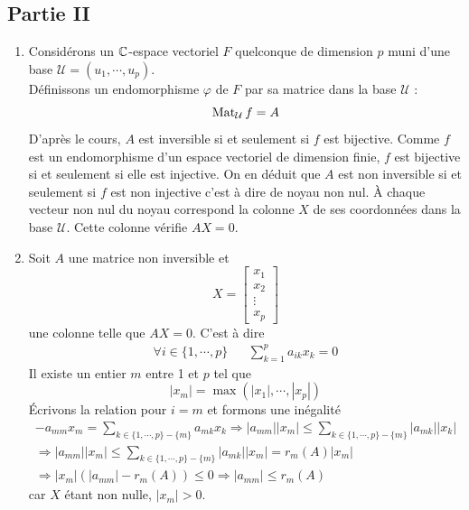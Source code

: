 \subsection*{Partie II}
\begin{enumerate}
\item Considérons un $\mathbb{C}$-espace vectoriel $F$ quelconque de dimension $p$ muni d'une base $\mathcal U =(u_1,\cdots,u_p)$.\\ Définissons un endomorphisme $\varphi$ de $F$ par sa matrice dans la base $\mathcal U$ :
\begin{displaymath}
 \operatorname{Mat}_{\mathcal U} f = A
\end{displaymath}
D'après le cours, $A$ est inversible si et seulement si $f$ est bijective. Comme $f$ est un endomorphisme d'un espace vectoriel de dimension finie, $f$ est bijective si et seulement si elle est injective. On en déduit que $A$ est non inversible si et seulement si $f$ est non injective c'est à dire de noyau non nul. \`A chaque vecteur non nul du noyau correspond la colonne $X$ de ses coordonnées dans la base $\mathcal U$. Cette colonne vérifie $AX=0$.
\item Soit $A$ une matrice non inversible et
\begin{displaymath}
 X=\begin{bmatrix}
    x_1\\
x_2\\
\vdots \\
x_p
   \end{bmatrix}
\end{displaymath}
une colonne telle que $AX=0$. C'est à dire
\begin{align*}
 \forall i\in\{1,\cdots,p\} & & \sum_{k=1}^{p}a_{ik}x_k = 0
\end{align*}
Il existe un entier $m$ entre 1 et $p$ tel que 
\begin{displaymath}
 |x_m|=\max (|x_1|,\cdots,|x_p|)
\end{displaymath}
\'Ecrivons la relation pour $i=m$ et formons une inégalité
\begin{multline*}
 -a_{mm}x_m = \sum_{k\in\{1,\cdots,p\}-\{m\}}a_{mk}x_k
\Rightarrow
|a_{mm}||x_m|\leq \sum_{k\in\{1,\cdots,p\}-\{m\}}|a_{mk}||x_k|\\
\Rightarrow
|a_{mm}||x_m|\leq \sum_{k\in\{1,\cdots,p\}-\{m\}}|a_{mk}||x_m|=r_m(A)|x_m| \\
\Rightarrow |x_m|\left( |a_{mm}| - r_m(A)\right) \leq 0 
\Rightarrow |a_{mm}|\leq r_m(A)
\end{multline*}
car $X$ étant non nulle, $|x_m|>0$.

\end{enumerate}
